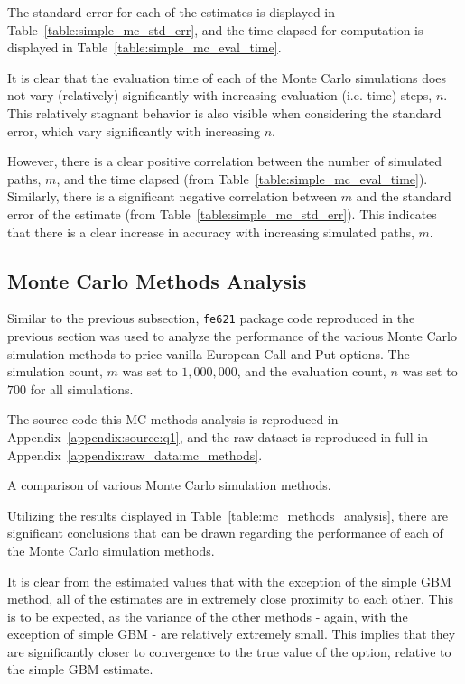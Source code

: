 \documentclass[10pt]{article}
\begin{document}
The standard error for each of the estimates is displayed in Table~\ref{table:simple_mc_std_err}, and the time elapsed for computation is displayed in Table~\ref{table:simple_mc_eval_time}.

It is clear that the evaluation time of each of the Monte Carlo simulations does not vary (relatively) significantly with increasing evaluation (i.e. time) steps, $n$. This relatively stagnant behavior is also visible when considering the standard error, which vary significantly with increasing $n$.

However, there is a clear positive correlation between the number of simulated paths, $m$, and the time elapsed (from Table~\ref{table:simple_mc_eval_time}). Similarly, there is a significant negative correlation between $m$ and the standard error of the estimate (from Table~\ref{table:simple_mc_std_err}). This indicates that there is a clear increase in accuracy with increasing simulated paths, $m$.

\newpage
\subsection{Monte Carlo Methods Analysis}

Similar to the previous subsection, \texttt{fe621} package code reproduced in the previous section was used to analyze the performance of the various Monte Carlo simulation methods to price vanilla European Call and Put options. The simulation count, $m$ was set to $1,000,000$, and the evaluation count, $n$ was set to $700$ for all simulations.

The source code this MC methods analysis is reproduced in Appendix~\ref{appendix:source:q1}, and the raw dataset is reproduced in full in Appendix~\ref{appendix:raw_data:mc_methods}.

\begin{table}[!h]
    \centering
    \caption{A comparison of various Monte Carlo simulation methods.}
    \label{table:mc_methods_analysis}
\end{table}

Utilizing the results displayed in Table~\ref{table:mc_methods_analysis}, there are significant conclusions that can be drawn regarding the performance of each of the Monte Carlo simulation methods.

It is clear from the estimated values that with the exception of the simple GBM method, all of the estimates are in extremely close proximity to each other. This is to be expected, as the variance of the other methods - again, with the exception of simple GBM - are relatively extremely small. This implies that they are significantly closer to convergence to the true value of the option, relative to the simple GBM estimate.
\end{document}
